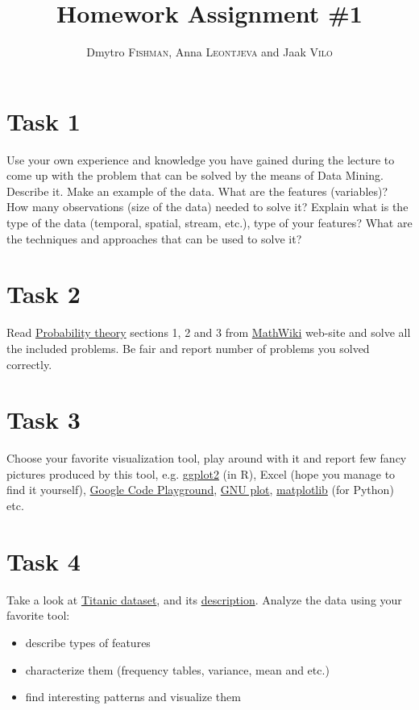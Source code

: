 \documentclass{article}
\title{Homework Assignment \#1} %
\author{Dmytro \textsc{Fishman}, Anna \textsc{Leontjeva} and Jaak \textsc{Vilo}} %
\begin{document}
\maketitle %
\section*{Task 1}
Use your own experience and knowledge you have gained during the lecture to come up with the problem that can be solved by the means of Data Mining. Describe it. Make an example of the data. What are the features (variables)? How many observations (size of the data) needed to solve it? Explain what is the type of the data (temporal, spatial, stream, etc.), type of your features? What are the techniques and approaches that can be used to solve it?  

\section*{Task 2}
Read \href{http://mathwiki.cs.ut.ee/probability_theory}{Probability theory} sections 1, 2 and 3 from \href{http://mathwiki.cs.ut.ee/start}{MathWiki} web-site and solve all the included problems. Be fair and report number of problems you solved correctly.

\section*{Task 3}
Choose your favorite visualization tool, play around with it and report few fancy pictures produced by this tool, e.g. \href{http://docs.ggplot2.org/current/}{ggplot2} (in R), Excel (hope you manage to find it yourself), \href{https://code.google.com/apis/ajax/playground/?type=visualization#motion_chart}{Google Code Playground}, \href{http://www.gnuplot.info/}{GNU plot}, \href{http://www.gnuplot.info/}{matplotlib} (for Python) etc. 

\section*{Task 4}
\label{sec:titanic}
Take a look at \href{http://courses.education.illinois.edu/EdPsy589/lectures/titanic3.xls}{Titanic dataset}, and its \href{http://www.kaggle.com/c/titanic-gettingStarted/data}{description}. Analyze the data using your favorite tool:
\begin{itemize}
\item describe types of features
\item characterize them (frequency tables, variance, mean and etc.)
\item find interesting patterns and visualize them
\end{itemize} 
\end{document}
